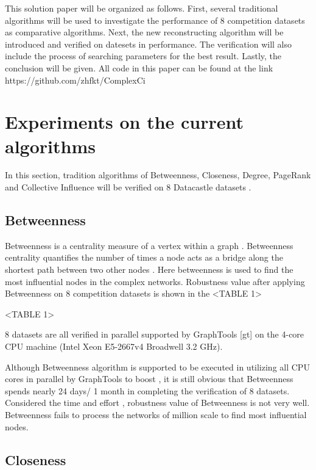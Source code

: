 \documentclass{article}
\begin{document}
	This solution paper will be organized as follows. First, several traditional algorithms will be used to investigate the performance of 8 competition datasets as comparative algorithms. Next, the new reconstructing algorithm will be introduced and verified on datesets in performance. The verification will also include the process of searching parameters for the best result. Lastly, the conclusion will be given. All code in this paper can be found at the link https://github.com/zhfkt/ComplexCi \cite{zhfktgithub} \cite{zhfkt2017887989}

	\section{Experiments on the current algorithms}
	
	In this section, tradition algorithms of Betweenness\cite{wikiBetweennesscentrality}, Closeness\cite{wikiClosenesscentrality}, Degree\cite{wikiCentrality}, PageRank\cite{wikiPageRank} and Collective Influence\cite{morone2015influence}\cite{morone2016collective} will be verified on 8 Datacastle datasets .


	\subsection{Betweenness}
	
	Betweenness is a centrality measure of a vertex within a graph . Betweenness centrality quantifies the number of times a node acts as a bridge along the shortest path between two other nodes \cite{wikiBetweennesscentrality}\cite{freeman1977set}. Here betweenness is used to find the most influential nodes in the complex networks. Robustness value after applying Betweenness on 8 competition datasets is shown in the <TABLE 1>
	
	<TABLE 1>
	
	8 datasets are all verified in parallel supported by GraphTools [gt] on the 4-core CPU machine (Intel Xeon E5-2667v4 Broadwell 3.2 GHz). 
	
	Although Betweenness algorithm is supported to be executed in utilizing all CPU cores in parallel by GraphTools \cite{peixotographtool2014} to boost , it is still obvious that Betweenness spends nearly 24 days/ 1 month in completing the verification of 8 datasets. Considered the time and effort , robustness value of Betweenness is not very well. Betweenness fails to process the networks of million scale to find most influential nodes.
	
	\subsection{Closeness}	
	
\end{document}
